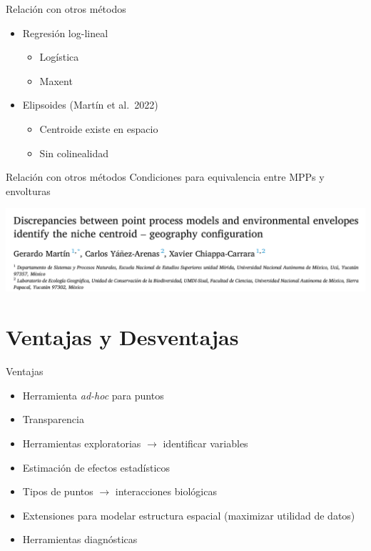 \documentclass[
  11pt,
  ignorenonframetext,
]{beamer}
\providecommand{\tightlist}{%
  \setlength{\itemsep}{0pt}\setlength{\parskip}{0pt}}
\begin{document}
\begin{frame}{Relación con otros métodos}
\protect\hypertarget{relaciuxf3n-con-otros-muxe9todos}{}
\begin{itemize}
\item
  Regresión log-lineal

  \begin{itemize}
  \tightlist
  \item
    Logística
  \item
    Maxent
  \end{itemize}
\item
  Elipsoides (Martín et al.~2022)

  \begin{itemize}
  \tightlist
  \item
    Centroide existe en espacio
  \item
    Sin colinealidad
  \end{itemize}
\end{itemize}
\end{frame}

\begin{frame}{Relación con otros métodos}
\protect\hypertarget{relaciuxf3n-con-otros-muxe9todos-1}{}
Condiciones para equivalencia entre MPPs y envolturas

\includegraphics{Figuras/Discrep.png}
\end{frame}

\hypertarget{ventajas-y-desventajas}{%
\section{Ventajas y Desventajas}\label{ventajas-y-desventajas}}

\begin{frame}{Ventajas}
\protect\hypertarget{ventajas}{}
\begin{itemize}
\tightlist
\item
  Herramienta \emph{ad-hoc} para puntos
\item
  Transparencia
\item
  Herramientas exploratorias \(\rightarrow\) identificar variables
\item
  Estimación de efectos estadísticos
\item
  Tipos de puntos \(\rightarrow\) interacciones biológicas
\item
  Extensiones para modelar estructura espacial (maximizar utilidad de
  datos)
\item
  Herramientas diagnósticas
\end{itemize}
\end{frame}
\end{document}
